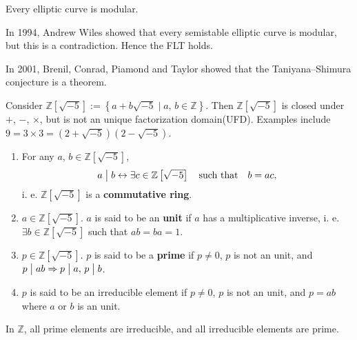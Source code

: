 \begin{conjecture}
    Every elliptic curve is modular.
\end{conjecture}

In 1994, Andrew Wiles showed that every semistable elliptic curve is modular, but
this is a contradiction. Hence the FLT holds.

In 2001, Brenil, Conrad, Piamond and Taylor showed that the Taniyana--Shimura
conjecture is a theorem.

\begin{note}
    Consider $\mathbb{Z}\left[\sqrt{-5}\right]
    := \left\{a+b\sqrt{-5}\mid a,\,b\in\mathbb{Z}\right\}$. Then $\mathbb{Z}\left[\sqrt{-5}\right]$ is
    closed under $+$, $-$, $\times$, but is not an unique factorization domain(UFD).
    Examples include $9=3\times 3=\left(2+\sqrt{-5}\right)\left(2-\sqrt{-5}\right)$.
\end{note}

\begin{definition}
    \begin{enumerate}
        \item For any $a,\,b\in\mathbb{Z}\left[\sqrt{-5}\right]$,
        \[
            a\bigm| b \leftrightarrow \exists c \in \mathbb{Z}\left[\sqrt{-5}\right]
            \quad \mbox{such that} \quad b=ac,
        \]
        i. e. $\mathbb{Z}\left[\sqrt{-5}\right]$ is a \textbf{commutative ring}.
        \item $a\in \mathbb{Z}\left[\sqrt{-5}\right]$. $a$ is said to be an \textbf{unit}
        if $a$ has a multiplicative inverse, i. e. $\exists b \in \mathbb{Z}\left[\sqrt{-5}\right]$
        such that $ab=ba=1$.
        \item $p\in \mathbb{Z}\left[\sqrt{-5}\right]$. $p$ is said to be a \textbf{prime}
        if $p\neq 0$, $p$ is not an unit, and $p \bigm| ab \Rightarrow p \bigm| a,\, p \bigm| b$.
        \item $p$ is said to be an irreducible element if $p \neq 0$, $p$ is not an unit, and
        $p=ab$ where $a$ or $b$ is an unit.
    \end{enumerate}
\end{definition}

\begin{remark}
    In $\mathbb{Z}$, all prime elements are irreducible, and all irreducible elements are prime.
\end{remark}


